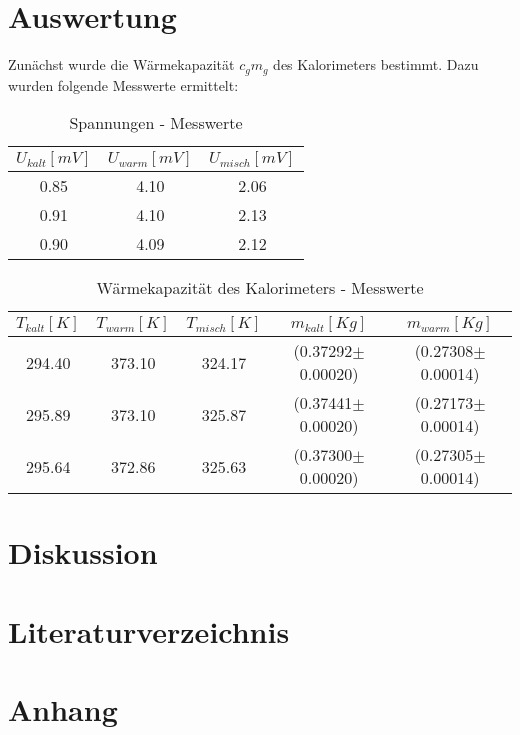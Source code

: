 \documentclass[11pt,ngerman,a4paper]{article}
\begin{document}
\section{Auswertung}
Zunächst wurde die Wärmekapazität $c_gm_g$ des Kalorimeters bestimmt. Dazu wurden folgende Messwerte ermittelt:
\begin{table}[h]
\centering
\begin{tabular}{|c|c|c|}
\hline
 $U_{kalt}[mV]$ &$U_{warm}[mV]$ &$U_{misch}[mV]$\\
\hline
0.85 & 4.10 & 2.06 \\
0.91 & 4.10 & 2.13 \\
0.90 & 4.09 & 2.12 \\
\hline
\end{tabular}
\caption{Spannungen - Messwerte}
\end{table}


\begin{table}[h]
\centering
\begin{tabular}{|c|c|c|c|c|}
\hline
$T_{kalt}[K]$ & $T_{warm}[K]$ & $T_{misch}[K]$ & $m_{kalt}[Kg]$ & $ m_{warm} [Kg]$ \\
\hline
294.40 & 373.10 & 324.17 & (0.37292$\pm$0.00020) & (0.27308$\pm$0.00014)\\
295.89 & 373.10 & 325.87 & (0.37441$\pm$0.00020) & (0.27173$\pm$0.00014)\\
295.64 & 372.86 & 325.63 & (0.37300$\pm$0.00020) & (0.27305$\pm$0.00014)\\
\hline
\end{tabular}
\caption{Wärmekapazität des Kalorimeters - Messwerte}
\end{table}



\section{Diskussion}


\section{Literaturverzeichnis}

\section{Anhang}
\end{document}
